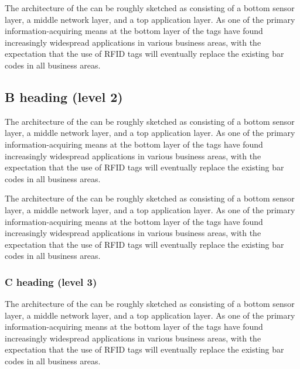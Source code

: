 \documentclass[10pt]{ietbook}
\begin{document}
The architecture of the can be roughly sketched
as consisting of a bottom sensor layer, a middle network layer, and a
top application layer. As one of the primary information-acquiring means
at the bottom layer of the
tags have found increasingly widespread applications in various business
areas, with the expectation that the use of RFID tags will eventually
replace the existing bar codes in all business areas.

\subsection{B heading (level 2)}

The architecture of the can be roughly sketched
as consisting of a bottom sensor layer, a middle network layer, and a
top application layer. As one of the primary information-acquiring means
at the bottom layer of the
tags have found increasingly widespread applications in various business
areas, with the expectation that the use of RFID tags will eventually
replace the existing bar codes in all business areas.

The architecture of the can be roughly sketched
as consisting of a bottom sensor layer, a middle network layer, and a
top application layer. As one of the primary information-acquiring means
at the bottom layer of the
tags have found increasingly widespread applications in various business
areas, with the expectation that the use of RFID tags will eventually
replace the existing bar codes in all business areas.

\subsubsection{C heading (level 3)}

The architecture of the can be roughly sketched
as consisting of a bottom sensor layer, a middle network layer, and a
top application layer. As one of the primary information-acquiring means
at the bottom layer of the
tags have found increasingly widespread applications in various business
areas, with the expectation that the use of RFID tags will eventually
replace the existing bar codes in all business areas.
\end{document}
